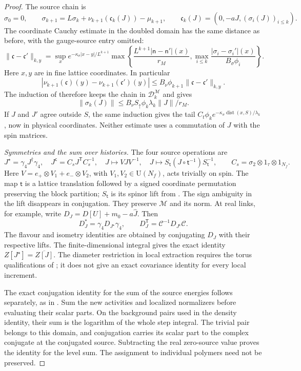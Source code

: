 \documentclass[11pt,letterpaper,reqno]{amsart}
\theoremstyle{definition}
\theoremstyle{remark}
\begin{document}
\begin{proof}
The source chain is
\[
 \sigma_0=0,\qquad
 \sigma_{k+1}=L\sigma_k+
        \nu_{k+1}(\mathfrak c_k(J))-\mu_{k+1},
 \qquad
 \mathfrak c_k(J)=(0,-aJ,(\sigma_i(J))_{i\le k}).
\]
The coordinate Cauchy estimate in the doubled domain
has the same distance as before, with the gauge-source
entry omitted:
\[
 \|\mathfrak c-\mathfrak c'\|_{k,y}
 =\sup_xe^{-\kappa_\sigma|x-y|/L^{k+1}}
 \max\left\{
   \frac{L^{k+1}|\mathsf n-\mathsf n'|(x)}{r_M},
   \max_{i\le k}\frac{|\sigma_i-\sigma_i'|(x)}
                            {B_\sigma\phi_i}\right\}.
\]
Here $x,y$ are in fine lattice coordinates. In particular
\[
 |\nu_{k+1}(\mathfrak c)(y)-\nu_{k+1}(\mathfrak c')(y)|
 \le B_\nu\phi_{k+1}\|\mathfrak c-\mathfrak c'\|_{k,y}.
\]
The induction of \cite[Lem. 10.4]{QCDM1} therefore
keeps the chain in $\mathscr D_k^{\mathcal M}$ and gives
\[
 \|\sigma_k(J)\|
 \le B_\nu S_\uparrow\phi_k
                   \lambda_k\|J\|/r_M.
\]
If $J$ and $J'$ agree outside $S$, the same induction
gives the tail
$C_t\phi_k e^{-\kappa_\sigma\operatorname{dist}(x,S)/\lambda_k}$,
now in physical coordinates. Neither estimate uses a
commutation of $J$ with the spin matrices.

\emph{Symmetries and the sum over histories.}
The four source operations are
\[
 J^\star=\gamma_4J^\dagger\gamma_4,\quad
 J^{\mathsf c}=C_sJ^{\mathsf T}C_s^{-1},\quad
 J\mapsto VJV^{-1},\quad
 J\mapsto S_{\mathsf t}(J\circ\mathsf t^{-1})S_{\mathsf t}^{-1},
 \qquad C_s=\sigma_2\otimes1_\tau\otimes1_{N_f}.
\]
Here $V=e_+\otimes V_1+e_-\otimes V_2$, with
$V_1,V_2\in\mathrm U(N_f)$, acts trivially on spin.
The map $\mathsf t$ is a lattice translation followed by a
signed coordinate permutation preserving the block partition;
$S_{\mathsf t}$ is its spinor lift from
\cite[proof of Prop. 2.5]{QCDM1}. The sign ambiguity
in the lift disappears in conjugation.
They preserve $\mathcal M$ and its norm. At real links,
for example, write $D_J=D[U]+m_0-a\hat J$. Then
\[
 D_J^*=\gamma_4D_{J^\star}\gamma_4,
 \qquad D_J^{\mathsf T}=\mathcal C^{-1}D_{J^{\mathsf c}}\mathcal C.
\]
The flavour and isometry identities are obtained by
conjugating $D_J$ with their respective lifts.
The finite-dimensional integral gives the exact identity
$Z[J^\star]=\overline{Z[J]}$. The diameter restriction in
local extraction requires the torus qualifications of
\cite[Prop. 10.1]{QCDM1}; it does not give an exact
covariance identity for every local increment.

The exact conjugation identity for the sum of the
source energies follows separately, as in
\cite[Prop. 10.6, proof]{QCDM1}. Sum the new activities
and localized normalizers before evaluating their scalar
parts. On the background pairs used in the density
identity, their sum is the logarithm of the whole step
integral. The trivial pair belongs to this domain, and
conjugation carries its scalar part to the complex
conjugate at the conjugated source. Subtracting the real
zero-source value proves the identity for the level
sum. The assignment to individual polymers need not
be preserved.


\end{proof}
\end{document}
